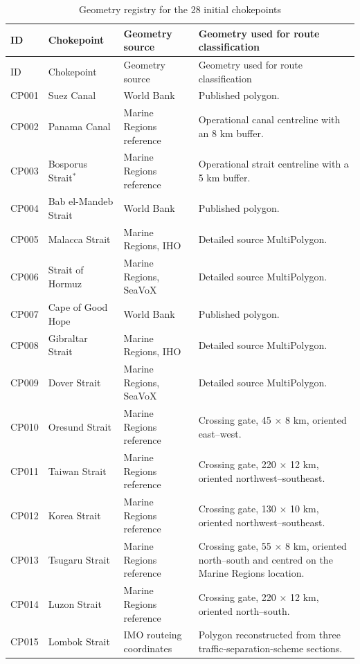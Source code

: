 \documentclass[pdftex,12pt,openright,a4paper,oneside]{book}
\begin{document}
\small
\begin{longtable}{@{}p{}p{}p{}p{}@{}}
\caption{Geometry registry for the 28 initial chokepoints}
\label{tab:chokepoint_geometry_registry}\\
\toprule
ID & Chokepoint & Geometry source & Geometry used for route classification \\
\midrule
\endfirsthead
\toprule
ID & Chokepoint & Geometry source & Geometry used for route classification \\
\midrule
\endhead
\bottomrule
\endfoot
CP001 & Suez Canal & World Bank & Published polygon. \\
CP002 & Panama Canal & Marine Regions reference & Operational canal centreline with an 8 km buffer. \\
CP003 & Bosporus Strait$^{*}$ & Marine Regions reference & Operational strait centreline with a 5 km buffer. \\
CP004 & Bab el-Mandeb Strait & World Bank & Published polygon. \\
CP005 & Malacca Strait & Marine Regions, IHO & Detailed source MultiPolygon. \\
CP006 & Strait of Hormuz & Marine Regions, SeaVoX & Detailed source MultiPolygon. \\
CP007 & Cape of Good Hope & World Bank & Published polygon. \\
CP008 & Gibraltar Strait & Marine Regions, IHO & Detailed source MultiPolygon. \\
CP009 & Dover Strait & Marine Regions, SeaVoX & Detailed source MultiPolygon. \\
CP010 & Oresund Strait & Marine Regions reference & Crossing gate, 45 $\times$ 8 km, oriented east--west. \\
CP011 & Taiwan Strait & Marine Regions reference & Crossing gate, 220 $\times$ 12 km, oriented northwest--southeast. \\
CP012 & Korea Strait & Marine Regions reference & Crossing gate, 130 $\times$ 10 km, oriented northwest--southeast. \\
CP013 & Tsugaru Strait & Marine Regions reference & Crossing gate, 55 $\times$ 8 km, oriented north--south and centred on the Marine Regions location. \\
CP014 & Luzon Strait & Marine Regions reference & Crossing gate, 220 $\times$ 12 km, oriented north--south. \\
CP015 & Lombok Strait & IMO routeing coordinates & Polygon reconstructed from three traffic-separation-scheme sections. \\

\end{longtable}
\end{document}

